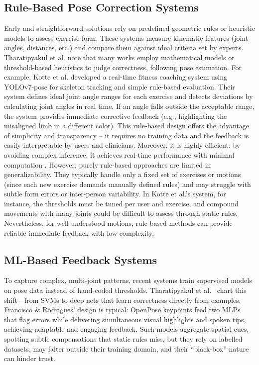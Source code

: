 \documentclass{article}
\begin{document}
\subsection{Rule-Based Pose Correction Systems} Early and straightforward solutions rely on predefined geometric rules or heuristic models to assess exercise form. These systems measure kinematic features (joint angles, distances, etc.) and compare them against ideal criteria set by experts. Tharatipyakul et al. \cite{Tharatipyakul2024Review} note that many works employ mathematical models or threshold-based heuristics to judge correctness, following pose estimation. For example, Kotte et al. \cite{Kotte2023} developed a real-time fitness coaching system using YOLOv7-pose for skeleton tracking and simple rule-based evaluation. Their system defines ideal joint angle ranges for each exercise and detects deviations by calculating joint angles in real time. If an angle falls outside the acceptable range, the system provides immediate corrective feedback (e.g., highlighting the misaligned limb in a different color). This rule-based design offers the advantage of simplicity and transparency – it requires no training data and the feedback is easily interpretable by users and clinicians. Moreover, it is highly efficient: by avoiding complex inference, it achieves real-time performance with minimal computation \cite{Kotte2023}. However, purely rule-based approaches are limited in generalizability. They typically handle only a fixed set of exercises or motions (since each new exercise demands manually defined rules) and may struggle with subtle form errors or inter-person variability. In Kotte et al.’s system, for instance, the thresholds must be tuned per user and exercise, and compound movements with many joints could be difficult to assess through static rules. Nevertheless, for well-understood motions, rule-based methods can provide reliable immediate feedback with low complexity. 

\subsection{ML-Based Feedback Systems}
To capture complex, multi-joint patterns, recent systems train supervised models on pose data instead of hand-coded thresholds. Tharatipyakul et al.~\cite{Tharatipyakul2024Review} chart this shift—from SVMs to deep nets that learn correctness directly from examples. Francisco \& Rodrigues’ design \cite{Francisco2022} is typical: OpenPose keypoints feed two MLPs that flag errors while delivering simultaneous visual highlights and spoken tips, achieving adaptable and engaging feedback. Such models aggregate spatial cues, spotting subtle compensations that static rules miss, but they rely on labelled datasets, may falter outside their training domain, and their “black-box” nature can hinder trust.
\end{document}
